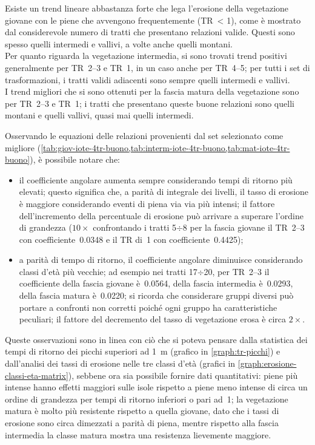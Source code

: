 Esiste un trend lineare abbastanza forte che lega l'erosione della vegetazione giovane con le piene che avvengono frequentemente (TR~\SI{< 1}{\anno}), come è mostrato dal considerevole numero di tratti che presentano relazioni valide.
Questi sono spesso quelli intermedi e vallivi, a volte anche quelli montani.
\\
Per quanto riguarda la vegetazione intermedia, si sono trovati trend positivi generalmente per TR~\SIrange[range-phrase = {-}, range-units = single]{2}{3}{\mesi} e TR~\SI{1}{\anno}, in un caso anche per TR~\SIrange[range-phrase = {-}, range-units = single]{4}{5}{\mesi}; per tutti i set di trasformazioni, i tratti validi adiacenti sono sempre quelli intermedi e vallivi.
\\
I trend migliori che si sono ottenuti per la fascia matura della vegetazione sono per TR~\SIrange[range-phrase = {-}, range-units = single]{2}{3}{\mesi} e TR~\SI{1}{\anno}; i tratti che presentano queste buone relazioni sono quelli montani e quelli vallivi, quasi mai quelli intermedi.

Osservando le equazioni delle relazioni provenienti dal set selezionato come migliore (\cref{tab:giov-iote-4tr-buono,tab:interm-iote-4tr-buono,tab:mat-iote-4tr-buono}), è possibile notare che:
%
\begin{itemize}
	\item il coefficiente angolare aumenta sempre considerando tempi di ritorno più elevati;
	questo significa che, a parità di integrale dei livelli, il tasso di erosione è maggiore considerando eventi di piena via via più intensi;
	il fattore dell'incremento della percentuale di erosione può arrivare a superare l'ordine di grandezza ($10\times$ confrontando i tratti 5$\div$8 per la fascia giovane il TR~\SIrange[range-phrase = {-}, range-units = single]{2}{3}{\mesi} con coefficiente~\num{0.0348} e il TR di~\SI{1}{\anno} con coefficiente~\num{0.4425});
	\item a parità di tempo di ritorno, il coefficiente angolare diminuisce considerando classi d'età più vecchie; ad esempio nei tratti 17$\div$20, per TR~\SIrange[range-phrase = {-}, range-units = single]{2}{3}{\mesi} il coefficiente della fascia giovane è~\num{0.0564}, della fascia intermedia è~\num{0.0293}, della fascia matura è~\num{0.0220};
	si ricorda che considerare gruppi diversi può portare a confronti non corretti poiché ogni gruppo ha caratteristiche peculiari;
	il fattore del decremento del tasso di vegetazione erosa è circa $2 \times$.
\end{itemize}
%
Queste osservazioni sono in linea con ciò che si poteva pensare dalla statistica dei tempi di ritorno dei picchi superiori ad \SI{1}{\m} (grafico in \cref{graph:tr-picchi}) e dall'analisi dei tassi di erosione nelle tre classi d'età (grafici in \cref{graph:erosione-classi-eta-matrix}), sebbene ora sia possibile fornire dati quantitativi:
piene più intense hanno effetti maggiori sulle isole rispetto a piene meno intense di circa un ordine di grandezza per tempi di ritorno inferiori o pari ad~\SI{1}{\anno};
la vegetazione matura è molto più resistente rispetto a quella giovane, dato che i tassi di erosione sono circa dimezzati a parità di piena, mentre rispetto alla fascia intermedia la classe matura mostra una resistenza lievemente maggiore.

